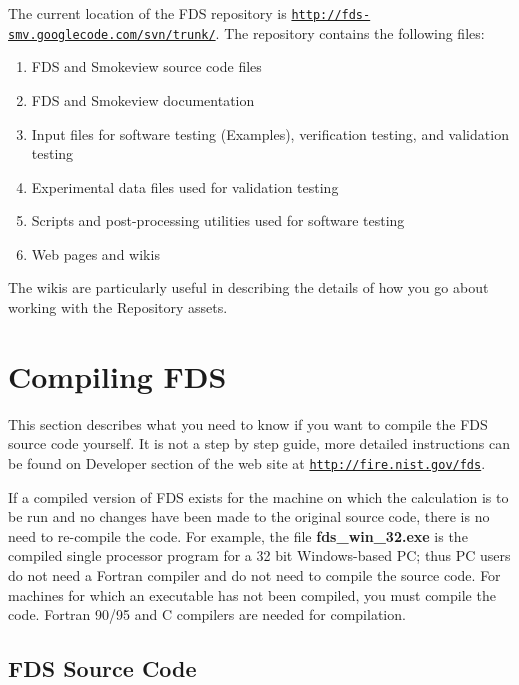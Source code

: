 \documentclass[11pt]{book}
\newcommand{\ct}{\tt\small}
\begin{document}
The current location of the FDS repository is \href{http://code.google.com/p/fds-smv/source/checkout}
{{\ct http://fds-smv.googlecode.com/svn/trunk/}}. The repository contains the following files:
\begin{enumerate}
\item FDS and Smokeview source code files
\item FDS and Smokeview documentation
\item Input files for software testing (Examples), verification testing, and validation testing
\item Experimental data files used for validation testing
\item Scripts and post-processing utilities used for software testing
\item Web pages and wikis
\end{enumerate}
The wikis are particularly useful in describing the details of how you go about working with the Repository assets.





\chapter{Compiling FDS}
\label{info:compilation}

This section describes what you need to know if you want to compile the FDS source code yourself.
It is not a step by step guide, more detailed instructions can be found on Developer section of the web site at \href{http://fire.nist.gov/fds}{{\ct http://fire.nist.gov/fds}}.

If a compiled version of FDS exists for the machine on which the
calculation is to be run and no changes have been made to
the original source code, there is no need to re-compile the code.
For example, the file {\bf fds\_win\_32.exe} is the
compiled single processor program for a 32 bit Windows-based PC;
thus PC users do not need a
Fortran compiler and do not need to compile the source code.
For machines for which an executable has not been compiled, you must
compile the code. Fortran 90/95 and C compilers are needed for compilation.

\section{FDS Source Code}
\end{document}
